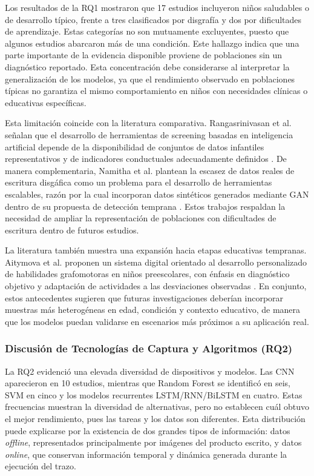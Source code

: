 \documentclass{iaesarticle}
\begin{document}
Los resultados de la RQ1 mostraron que 17 estudios incluyeron niños saludables
o de desarrollo típico, frente a tres clasificados por disgrafía y dos por
dificultades de aprendizaje. Estas categorías no son mutuamente excluyentes,
puesto que algunos estudios abarcaron más de una condición. Este
hallazgo indica que una parte importante de la evidencia disponible
proviene de poblaciones sin un diagnóstico reportado. Esta concentración debe
considerarse al interpretar la generalización de los modelos, ya que el
rendimiento observado en poblaciones típicas no garantiza el mismo
comportamiento en niños con necesidades clínicas o educativas específicas.

Esta limitación coincide con la literatura comparativa. Rangasrinivasan et al.
señalan que el desarrollo de herramientas de screening basadas en inteligencia
artificial depende de la disponibilidad de conjuntos de datos infantiles
representativos y de indicadores conductuales adecuadamente definidos
\cite{Rangasrinivasan2025}. De manera complementaria, Namitha et al. plantean
la escasez de datos reales de escritura disgáfica como un problema para el
desarrollo de herramientas escalables, razón por la cual incorporan datos
sintéticos generados mediante GAN dentro de su propuesta de detección temprana
\cite{Namitha2026}. Estos trabajos respaldan la necesidad de ampliar la
representación de poblaciones con dificultades de escritura dentro de futuros
estudios.

La literatura también muestra una expansión hacia etapas educativas tempranas.
Aitymova et al. proponen un sistema digital orientado al desarrollo
personalizado de habilidades grafomotoras en niños preescolares, con énfasis en
diagnóstico objetivo y adaptación de actividades a las desviaciones observadas
\cite{Aitymova2025}. En conjunto, estos antecedentes sugieren que futuras
investigaciones deberían incorporar muestras más heterogéneas en edad,
condición y contexto educativo, de manera que los modelos puedan validarse en
escenarios más próximos a su aplicación real.

\subsubsection{Discusión de Tecnologías de Captura y Algoritmos (RQ2)}

La RQ2 evidenció una elevada diversidad de dispositivos y modelos. Las CNN
aparecieron en 10 estudios, mientras que Random Forest se identificó en seis, SVM en cinco y los modelos recurrentes LSTM/RNN/BiLSTM en cuatro.
Estas frecuencias muestran la diversidad de alternativas, pero no establecen
cuál obtuvo el mejor rendimiento, pues las tareas y los datos son diferentes. Esta distribución puede
explicarse por la existencia de dos grandes tipos de información: datos \textit{offline},
representados principalmente por imágenes del producto escrito, y datos
\textit{online}, que conservan información temporal y dinámica generada
durante la ejecución del trazo.
\end{document}
